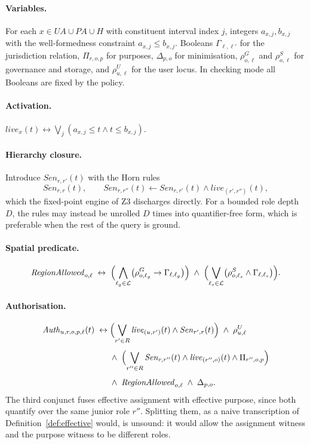 \documentclass[11pt]{article}
\theoremstyle{definition}
\theoremstyle{plain}
\theoremstyle{remark}
\newcommand{\Auth}{\mathit{Auth}}
\newcommand{\RegionOK}{\mathit{RegionAllowed}}
\newcommand{\Ldom}{\mathcal{L}}
\begin{document}
\paragraph{Variables.} For each $x \in UA \cup PA \cup H$ with constituent
interval index $j$, integers $a_{x,j}, b_{x,j}$ with the well-formedness
constraint $a_{x,j} \le b_{x,j}$. Booleans $\Gamma_{\ell,\ell'}$ for the
jurisdiction relation, $\Pi_{r,o,p}$ for purposes, $\Delta_{p,o}$ for
minimisation, $\rho^{G}_{o,\ell}$ and $\rho^{S}_{o,\ell}$ for governance and
storage, and $\rho^{U}_{u,\ell}$ for the user locus. In checking mode all
Booleans are fixed by the policy.

\paragraph{Activation.} $\mathit{live}_x(t) \leftrightarrow
\bigvee_j (a_{x,j} \le t \land t \le b_{x,j})$.

\paragraph{Hierarchy closure.} Introduce $\mathit{Sen}_{r,r'}(t)$ with the
Horn rules
\[
  \mathit{Sen}_{r,r}(t), \qquad
  \mathit{Sen}_{r,r''}(t) \leftarrow
    \mathit{Sen}_{r,r'}(t) \land \mathit{live}_{(r',r'')}(t),
\]
which the fixed-point engine of Z3 discharges directly. For a bounded role
depth $D$, the rules may instead be unrolled $D$ times into quantifier-free
form, which is preferable when the rest of the query is ground.

\paragraph{Spatial predicate.}
\[
  \RegionOK_{o,\ell}
  \;\leftrightarrow\;
  \Bigl(\bigwedge_{\ell_g \in \Ldom}
      \bigl(\rho^{G}_{o,\ell_g} \rightarrow \Gamma_{\ell,\ell_g}\bigr)\Bigr)
  \;\land\;
  \Bigl(\bigvee_{\ell_s \in \Ldom}
      \bigl(\rho^{S}_{o,\ell_s} \land \Gamma_{\ell,\ell_s}\bigr)\Bigr).
\]

\paragraph{Authorisation.}
\[
\begin{aligned}
  \Auth_{u,r,o,p,\ell}(t) \;\leftrightarrow\;
  & \Bigl(\bigvee_{r' \in R}
      \mathit{live}_{(u,r')}(t) \land \mathit{Sen}_{r',r}(t)\Bigr)
    \;\land\; \rho^{U}_{u,\ell} \\[4pt]
  &\land\;
    \Bigl(\bigvee_{r'' \in R}
      \mathit{Sen}_{r,r''}(t) \land \mathit{live}_{(r'',o)}(t)
      \land \Pi_{r'',o,p}\Bigr) \\[4pt]
  &\land\; \RegionOK_{o,\ell} \;\land\; \Delta_{p,o}.
\end{aligned}
\]
The third conjunct fuses effective assignment with effective purpose, since both
quantify over the same junior role $r''$. Splitting them, as a naive
transcription of Definition~\ref{def:effective} would, is unsound: it would
allow the assignment witness and the purpose witness to be different roles.
\end{document}
